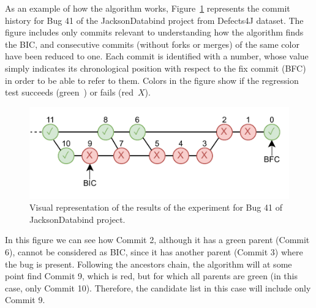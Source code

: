 As an example of how the algorithm works, Figure~\ref{fig:bug41} represents the commit history for Bug 41 of the JacksonDatabind project from Defects4J dataset. 
The figure includes only commits relevant to understanding how the algorithm finds the BIC, and consecutive commits (without forks or merges) of the same color have been reduced to one. 
Each commit is identified with a number, whose value simply indicates its chronological position with respect to the fix commit (BFC) in order to be able to refer to them.
Colors in the figure show if the regression test succeeds (green~\checkmark) or fails (red~$X$).

\begin{figure}[ht!]
  \centering   
  \includegraphics[width=\columnwidth]{pages/03-BugHunter/images/Databind_41_Inverted.pdf}
  \caption{Visual representation of the results of the experiment for Bug 41 of JacksonDatabind project.}
  \label{fig:bug41}
\end{figure}

In this figure we can see how Commit 2, although it has a green parent (Commit 6), cannot be considered as BIC, since it has another parent (Commit 3) where the bug is present. Following the ancestors chain, the algorithm will at some point find Commit 9, which is red, but for which all parents are green (in this case, only Commit 10). 
Therefore, the candidate list in this case will include only Commit 9.


